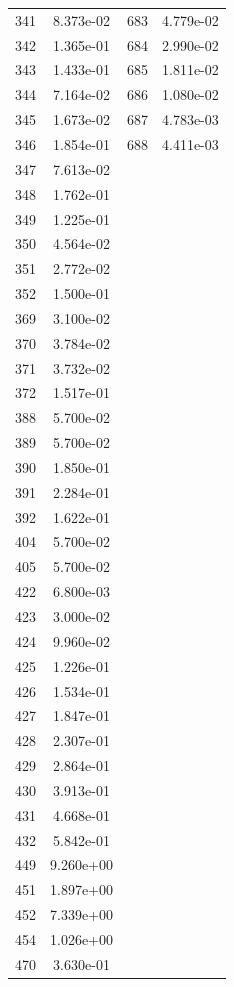 \documentclass[12pt]{article}
\begin{document}
\begin{longtable}{@{}cccc@{}}
341 & 8.373e-02 & 683 & 4.779e-02 \\
342 & 1.365e-01 & 684 & 2.990e-02 \\
343 & 1.433e-01 & 685 & 1.811e-02 \\
344 & 7.164e-02 & 686 & 1.080e-02 \\
345 & 1.673e-02 & 687 & 4.783e-03 \\
346 & 1.854e-01 & 688 & 4.411e-03 \\
347 & 7.613e-02 &  &  \\
348 & 1.762e-01 &  &  \\
349 & 1.225e-01 &  &  \\
350 & 4.564e-02 &  &  \\
351 & 2.772e-02 &  &  \\
352 & 1.500e-01 &  &  \\
369 & 3.100e-02 &  &  \\
370 & 3.784e-02 &  &  \\
371 & 3.732e-02 &  &  \\
372 & 1.517e-01 &  &  \\
388 & 5.700e-02 &  &  \\
389 & 5.700e-02 &  &  \\
390 & 1.850e-01 &  &  \\
391 & 2.284e-01 &  &  \\
392 & 1.622e-01 &  &  \\
404 & 5.700e-02 &  &  \\
405 & 5.700e-02 &  &  \\
422 & 6.800e-03 &  &  \\
423 & 3.000e-02 &  &  \\
424 & 9.960e-02 &  &  \\
425 & 1.226e-01 &  &  \\
426 & 1.534e-01 &  &  \\
427 & 1.847e-01 &  &  \\
428 & 2.307e-01 &  &  \\
429 & 2.864e-01 &  &  \\
430 & 3.913e-01 &  &  \\
431 & 4.668e-01 &  &  \\
432 & 5.842e-01 &  &  \\
449 & 9.260e+00 &  &  \\
451 & 1.897e+00 &  &  \\
452 & 7.339e+00 &  &  \\
454 & 1.026e+00 &  &  \\
470 & 3.630e-01 &  &  \\

\end{longtable}
\end{document}
